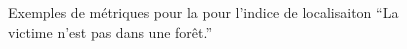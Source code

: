 \begin{figure}
  \centering
  \hspace{1cm}
  \caption{Exemples de métriques pour la pour l'indice de localisaiton
    \enquote{La victime n'est pas dans une forêt.}}
  \label{fig:metrique_dist_foret}
\end{figure}

